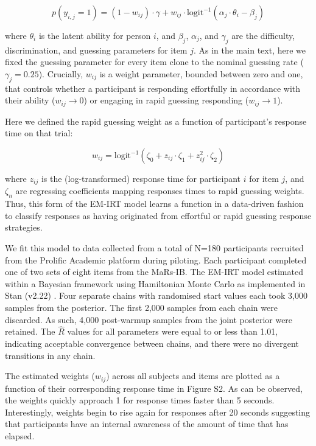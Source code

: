 \documentclass[a4paper,man,natbib]{apa6}
\begin{document}
\begin{equation*}
    p(y_{i,j} = 1) = (1-w_{ij}) \cdot \gamma + w_{ij} \cdot \text{logit}^{-1} \left( \alpha_{j} \cdot \theta_i - \beta_{j} \right)
\end{equation*}

\noindent where $\theta_i$ is the latent ability for person $i$, and $\beta_{j}$, $\alpha_{j}$, and $\gamma_{j}$ are the difficulty, discrimination, and guessing parameters for item $j$. As in the main text, here we fixed the guessing parameter for every item clone to the nominal guessing rate ($\gamma_{j} = 0.25$). Crucially, $w_{ij}$ is a weight parameter, bounded between zero and one, that controls whether a participant is responding effortfully in accordance with their ability ($w_{ij} \rightarrow 0$) or engaging in rapid guessing responding ($w_{ij} \rightarrow 1$).

Here we defined the rapid guessing weight as a function of participant's response time on that trial:

\begin{equation*}
    w_{ij} = \text{logit}^{-1} \left( \zeta_0 + z_{ij} \cdot \zeta_1 + z_{ij}^2 \cdot \zeta_2 \right)
\end{equation*}

\noindent where $z_{ij}$ is the (log-transformed) response time for participant $i$ for item $j$, and  $\zeta_n$ are regressing coefficients mapping responses times to rapid guessing weights. Thus, this form of the EM-IRT model learns a function in a data-driven fashion to classify responses as having originated from effortful or rapid guessing response strategies. 

We fit this model to data collected from a total of N=180 participants recruited from the Prolific Academic platform during piloting. Each participant completed one of two sets of eight items from the MaRs-IB. The EM-IRT model estimated within a Bayesian framework using Hamiltonian Monte Carlo as implemented in Stan (v2.22) \citep{carpenter2017stan}. Four separate chains with randomised start values each took 3,000 samples from the posterior. The first 2,000 samples from each chain were discarded. As such, 4,000 post-warmup samples from the joint posterior were retained. The $\hat{R}$ values for all parameters were equal to or less than 1.01, indicating acceptable convergence between chains, and there were no divergent transitions in any chain.  

The estimated weights ($w_{ij}$) across all subjects and items are plotted as a function of their corresponding response time in Figure S2. As can be observed, the weights quickly approach 1 for response times faster than 5 seconds. Interestingly, weights begin to rise again for responses after 20 seconds suggesting that participants have an internal awareness of the amount of time that has elapsed.
\end{document}
